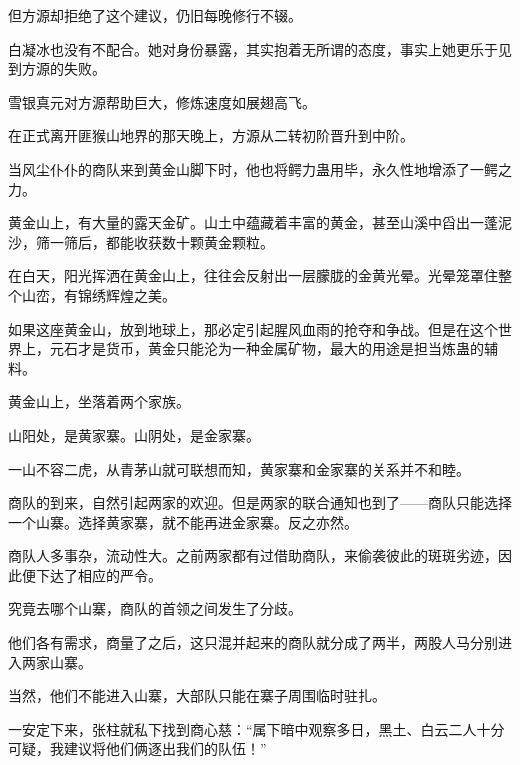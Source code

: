 \begin{this_body}
但方源却拒绝了这个建议，仍旧每晚修行不辍。

白凝冰也没有不配合。她对身份暴露，其实抱着无所谓的态度，事实上她更乐于见到方源的失败。

雪银真元对方源帮助巨大，修炼速度如展翅高飞。

在正式离开匪猴山地界的那天晚上，方源从二转初阶晋升到中阶。

当风尘仆仆的商队来到黄金山脚下时，他也将鳄力蛊用毕，永久性地增添了一鳄之力。

黄金山上，有大量的露天金矿。山土中蕴藏着丰富的黄金，甚至山溪中舀出一蓬泥沙，筛一筛后，都能收获数十颗黄金颗粒。

在白天，阳光挥洒在黄金山上，往往会反射出一层朦胧的金黄光晕。光晕笼罩住整个山峦，有锦绣辉煌之美。

如果这座黄金山，放到地球上，那必定引起腥风血雨的抢夺和争战。但是在这个世界上，元石才是货币，黄金只能沦为一种金属矿物，最大的用途是担当炼蛊的辅料。

黄金山上，坐落着两个家族。

山阳处，是黄家寨。山阴处，是金家寨。

一山不容二虎，从青茅山就可联想而知，黄家寨和金家寨的关系并不和睦。

商队的到来，自然引起两家的欢迎。但是两家的联合通知也到了——商队只能选择一个山寨。选择黄家寨，就不能再进金家寨。反之亦然。

商队人多事杂，流动性大。之前两家都有过借助商队，来偷袭彼此的斑斑劣迹，因此便下达了相应的严令。

究竟去哪个山寨，商队的首领之间发生了分歧。

他们各有需求，商量了之后，这只混并起来的商队就分成了两半，两股人马分别进入两家山寨。

当然，他们不能进入山寨，大部队只能在寨子周围临时驻扎。

一安定下来，张柱就私下找到商心慈：“属下暗中观察多日，黑土、白云二人十分可疑，我建议将他们俩逐出我们的队伍！”

\end{this_body}

